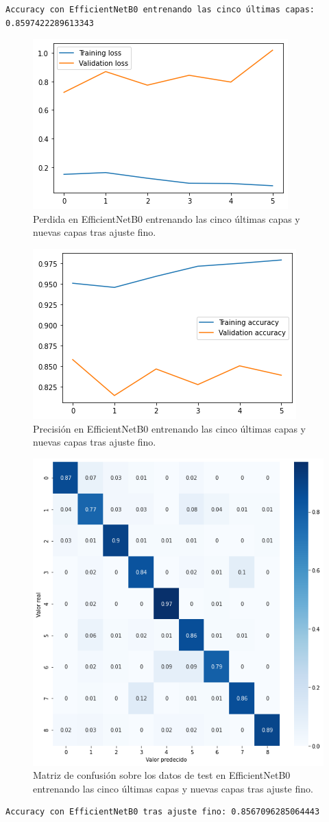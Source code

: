 \begin{lstlisting}
Accuracy con EfficientNetB0 entrenando las cinco últimas capas: 0.8597422289613343
\end{lstlisting}


\begin{figure}[H]
  \centering
  \includegraphics[width=0.5\linewidth]{Imagenes/entrenamiento_redes/5-ult/efficientnet_5fine_loss.png}
  \caption{Perdida en EfficientNetB0 entrenando las cinco últimas capas y nuevas capas tras ajuste fino.}
\end{figure}

\begin{figure}[H]
  \centering
  \includegraphics[width=0.5\linewidth]{Imagenes/entrenamiento_redes/5-ult/efficientnet_5fine_acc.png}
  \caption{Precisión en EfficientNetB0 entrenando las cinco últimas capas y nuevas capas tras ajuste fino.}
\end{figure}

\begin{figure}[H]
  \centering
  \includegraphics[width=0.5\linewidth]{Imagenes/entrenamiento_redes/5-ult/efficientnet_5fine_matriz.png}
  \caption{Matriz de confusión sobre los datos de test en EfficientNetB0 entrenando las cinco últimas capas y nuevas capas tras ajuste fino.}
\end{figure}


\begin{lstlisting}
Accuracy con EfficientNetB0 tras ajuste fino: 0.8567096285064443
\end{lstlisting}
